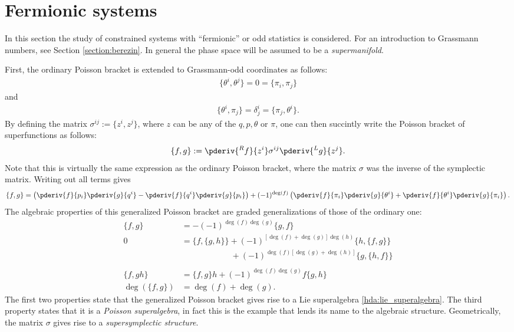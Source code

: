 \section{Fermionic systems}

    In this section the study of constrained systems with ``fermionic'' or odd statistics is considered. For an introduction to Grassmann numbers, see Section \ref{section:berezin}. In general the phase space will be assumed to be a \textit{supermanifold}.

    First, the ordinary Poisson bracket is extended to Grassmann-odd coordinates as follows:
    \begin{gather}
        \{\theta^i,\theta^j\} = 0 = \{\pi_i,\pi_j\}
    \end{gather}
    and
    \begin{gather}
        \{\theta^i,\pi_j\} = \delta^i_j = \{\pi_j,\theta^i\}.
    \end{gather}
    By defining the matrix $\sigma^{ij} := \{z^i,z^j\}$, where $z$ can be any of the $q,p,\theta$ or $\pi$, one can then succintly write the Poisson bracket of superfunctions as follows:
    \begin{gather}
        \{f,g\} := \pderiv{^Rf}{z^i}\sigma^{ij}\pderiv{^Lg}{z^j}.
    \end{gather}
    Note that this is virtually the same expression as the ordinary Poisson bracket, where the matrix $\sigma$ was the inverse of the symplectic matrix. Writing out all terms gives
    \begin{gather}
        \{f,g\} = \left(\pderiv{f}{p_i}\pderiv{g}{q^i}-\pderiv{f}{q^i}\pderiv{g}{p_i}\right) + (-1)^{\deg(f)}\left(\pderiv{f}{\pi_i}\pderiv{g}{\theta^i} + \pderiv{f}{\theta^i}\pderiv{g}{\pi_i}\right).
    \end{gather}
    The algebraic properties of this generalized Poisson bracket are graded generalizations of those of the ordinary one:
    \begin{align}
        \{f,g\} &= -(-1)^{\deg(f)\deg(g)}\{g,f\}\\
        0 &= \{f,\{g,h\}\} + (-1)^{[\deg(f)+\deg(g)]\deg(h)}\{h,\{f,g\}\}\nonumber\\
        &\ \phantom{= \{f,\{g,h\}\} } + (-1)^{\deg(f)[\deg(g)+\deg(h)]}\{g,\{h,f\}\}\\\nonumber\\
        \{f,gh\} &= \{f,g\}h + (-1)^{\deg(f)\deg(g)}f\{g,h\}\\
        \deg(\{f,g\}) &= \deg(f)+\deg(g).
    \end{align}
    The first two properties state that the generalized Poisson bracket gives rise to a Lie superalgebra \ref{hda:lie_superalgebra}. The third property states that it is a \textit{Poisson superalgebra}, in fact this is the example that lends its name to the algebraic structure. Geometrically, the matrix $\sigma$ gives rise to a \textit{supersymplectic structure}.

